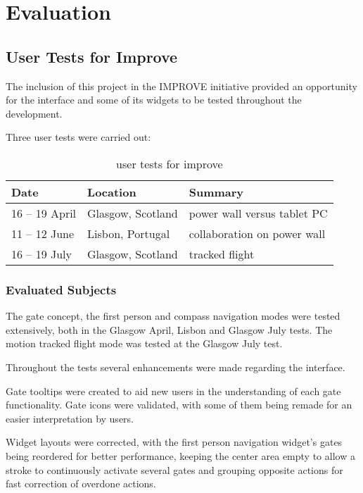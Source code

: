 \chapter{Evaluation}



\section{User Tests for Improve}

The inclusion of this project in the IMPROVE initiative provided an opportunity
for the interface and some of its widgets to be tested throughout the development.

Three user tests were carried out:

\begin{table}[ht]
		\centering
				\begin{tabular}{|l|l|l|}
						\hline
						Date						& Location					& Summary \\
						\hline
						16 -- 19 April	& Glasgow, Scotland	& power wall versus tablet PC \\
						11 -- 12 June		& Lisbon, Portugal	& collaboration on power wall \\
						16 -- 19 July		& Glasgow, Scotland	& tracked flight \\ %
						\hline
				\end{tabular}
		\caption{user tests for improve}
		\label{tab:user-tests}
\end{table}

\subsection{Evaluated Subjects}

The gate concept, the first person and compass navigation modes were tested extensively,
both in the Glasgow April, Lisbon and Glasgow July tests.
The motion tracked flight mode was tested at the Glasgow July test.

Throughout the tests several enhancements were made regarding the interface.

Gate tooltips were created to aid new users in the understanding of each gate functionality.
Gate icons were validated, with some of them being remade for an easier interpretation by users.

Widget layouts were corrected, with the first person navigation widget's gates being reordered
for better performance, keeping the center area empty to allow a stroke to continuously activate
several gates and grouping opposite actions for fast correction of overdone actions.

